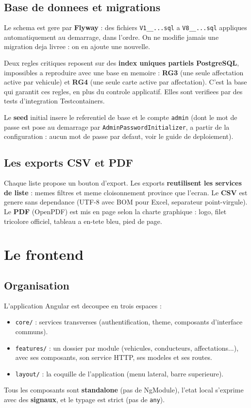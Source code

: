 \documentclass[11pt]{article}
\begin{document}
\subsection{Base de donnees et migrations}
Le schema est gere par \textbf{Flyway} : des fichiers \texttt{V1\_\_...sql} a \texttt{V8\_\_...sql}
appliques automatiquement au demarrage, dans l'ordre. On ne modifie jamais une migration deja livree :
on en ajoute une nouvelle.
\begin{srmwarn}
Deux regles critiques reposent sur des \textbf{index uniques partiels PostgreSQL}, impossibles a
reproduire avec une base en memoire : \textbf{RG3} (une seule affectation active par vehicule) et
\textbf{RG4} (une seule carte active par affectation). C'est la base qui garantit ces regles, en plus du
controle applicatif. Elles sont verifiees par des tests d'integration Testcontainers.
\end{srmwarn}
Le \textbf{seed} initial insere le referentiel de base et le compte \texttt{admin} (dont le mot de passe
est pose au demarrage par \texttt{AdminPasswordInitializer}, a partir de la configuration : aucun mot de
passe par defaut, voir le guide de deploiement).

\subsection{Les exports CSV et PDF}
Chaque liste propose un bouton d'export. Les exports \textbf{reutilisent les services de liste} : memes
filtres et meme cloisonnement province que l'ecran. Le \textbf{CSV} est genere sans dependance (UTF-8
avec BOM pour Excel, separateur point-virgule). Le \textbf{PDF} (OpenPDF) est mis en page selon la charte
graphique : logo, filet tricolore officiel, tableau a en-tete bleu, pied de page.

\section{Le frontend}

\subsection{Organisation}
L'application Angular est decoupee en trois espaces :
\begin{itemize}
  \item \texttt{core/} : services transverses (authentification, theme, composants d'interface communs).
  \item \texttt{features/} : un dossier par module (vehicules, conducteurs, affectations...), avec ses
        composants, son service HTTP, ses modeles et ses routes.
  \item \texttt{layout/} : la coquille de l'application (menu lateral, barre superieure).
\end{itemize}
Tous les composants sont \textbf{standalone} (pas de NgModule), l'etat local s'exprime avec des
\textbf{signaux}, et le typage est strict (pas de \texttt{any}).
\end{document}
